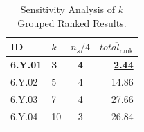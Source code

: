 \begin{table}[ht]
\centering
\footnotesize
\caption{Sensitivity Analysis of $k$ Grouped Ranked Results.}
\label{tab:k_sensitivity_grouped_ranked}
\begin{tabular}{@{}llcr@{}}
\hline
    ID & $k$ & $n_s/4$ & $\overline{total_{\text{rank}}}$ \\
\hline
    \textbf{6.Y.01} & \textbf{3} & \textbf{4} & \textbf{\underline{2.44}} \\
    6.Y.02 & 5 & 4 & 14.86 \\
    6.Y.03 & 7 & 4 & 27.66 \\
    6.Y.04 & 10 & 3 & 26.84 \\
\hline
\end{tabular}
\end{table}